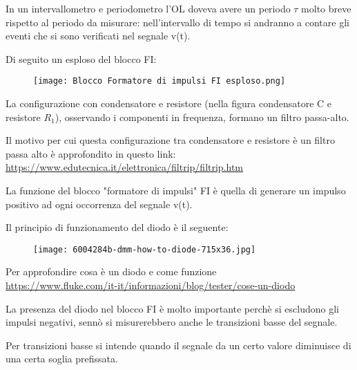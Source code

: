 In un intervallometro e periodometro l'OL doveva avere un periodo $\tau$ molto breve rispetto al periodo da misurare: 
nell'intervallo di tempo si andranno a contare gli eventi che si sono verificati nel segnale v(t). \newline 

Di seguito un esploso del blocco FI: 

\begin{figure}[h]
    \centering
    \texttt{[image: Blocco Formatore di impulsi FI esploso.png]}
\end{figure}

La configurazione con condensatore e resistore (nella figura condensatore C e resistore $R_1$), osservando i componenti in frequenza, 
formano un filtro passa-alto. \newline 

\begin{tcolorbox}
Il motivo per cui questa configurazione tra condensatore e resistore è un filtro passa alto è approfondito in questo link: \\
\url{https://www.edutecnica.it/elettronica/filtrip/filtrip.htm}    
\end{tcolorbox}

La funzione del blocco "formatore di impulsi" FI è quella di generare un impulso positivo ad ogni occorrenza del segnale v(t). \newline 

Il principio di funzionamento del diodo è il seguente: 

\begin{figure}[h]
    \centering
    \texttt{[image: 6004284b-dmm-how-to-diode-715x36.jpg]}
\end{figure}

\newpage 

\begin{tcolorbox}
    Per approfondire cosa è un diodo e come funzione \\
    \url{https://www.fluke.com/it-it/informazioni/blog/tester/cose-un-diodo}
\end{tcolorbox}

La presenza del diodo nel blocco FI è molto importante perchè si escludono gli impulsi negativi, 
sennò si misurerebbero anche le transizioni basse del segnale. \newline 

Per transizioni basse si intende quando il segnale da un certo valore diminuisce di una certa soglia prefissata. \newline 

